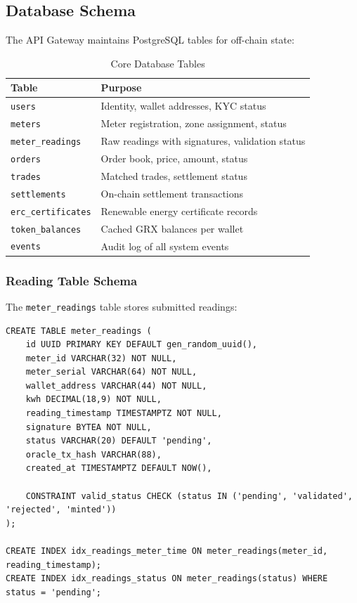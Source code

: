 \documentclass[conference]{IEEEtran}
\begin{document}
\subsection{Database Schema}

The API Gateway maintains PostgreSQL tables for off-chain state:

\begin{table}[htbp]
\caption{Core Database Tables}
\begin{center}
\begin{tabular}{lp{9cm}}
\toprule
\textbf{Table} & \textbf{Purpose} \\
\midrule
\texttt{users} & Identity, wallet addresses, KYC status \\
\texttt{meters} & Meter registration, zone assignment, status \\
\texttt{meter\_readings} & Raw readings with signatures, validation status \\
\texttt{orders} & Order book, price, amount, status \\
\texttt{trades} & Matched trades, settlement status \\
\texttt{settlements} & On-chain settlement transactions \\
\texttt{erc\_certificates} & Renewable energy certificate records \\
\texttt{token\_balances} & Cached GRX balances per wallet \\
\texttt{events} & Audit log of all system events \\
\bottomrule
\end{tabular}
\label{tab:database}
\end{center}
\end{table}

\subsubsection{Reading Table Schema}

The \texttt{meter\_readings} table stores submitted readings:

\begin{lstlisting}[caption={Meter Readings Table Schema}]
CREATE TABLE meter_readings (
    id UUID PRIMARY KEY DEFAULT gen_random_uuid(),
    meter_id VARCHAR(32) NOT NULL,
    meter_serial VARCHAR(64) NOT NULL,
    wallet_address VARCHAR(44) NOT NULL,
    kwh DECIMAL(18,9) NOT NULL,
    reading_timestamp TIMESTAMPTZ NOT NULL,
    signature BYTEA NOT NULL,
    status VARCHAR(20) DEFAULT 'pending',
    oracle_tx_hash VARCHAR(88),
    created_at TIMESTAMPTZ DEFAULT NOW(),
    
    CONSTRAINT valid_status CHECK (status IN ('pending', 'validated', 'rejected', 'minted'))
);

CREATE INDEX idx_readings_meter_time ON meter_readings(meter_id, reading_timestamp);
CREATE INDEX idx_readings_status ON meter_readings(status) WHERE status = 'pending';
\end{lstlisting}
\end{document}
